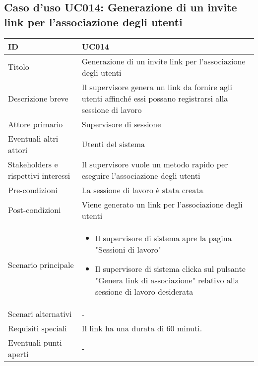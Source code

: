 \documentclass[../../main.tex]{subfiles}
\begin{document}
\subsection{Caso d’uso UC014: Generazione di un invite link per l'associazione degli utenti }
\begin{tabularx}{150mm}{|l|X|}
    \hline
    ID                                  & \textbf{UC014}\\
    \hline
    Titolo                              & Generazione di un invite link per l'associazione degli utenti \\
    \hline
    Descrizione breve                   & Il supervisore genera un link da fornire agli utenti affinché essi possano registrarsi alla sessione di lavoro   \\
    \hline
    Attore primario                     & Supervisore di sessione   \\
    \hline
    Eventuali altri attori              & Utenti del sistema   \\
    \hline
    Stakeholders e rispettivi interessi & Il supervisore vuole un metodo rapido per eseguire l'associazione degli utenti   \\
    \hline
    Pre-condizioni                      & La sessione di lavoro è stata creata   \\
    \hline
    Post-condizioni                     & Viene generato un link per l'associazione degli utenti   \\
    \hline
    Scenario principale                 & 
    \begin{itemize}
        \item Il supervisore di sistema apre la pagina "Sessioni di lavoro"
        \item Il supervisore di sistema clicka sul pulsante "Genera link di associazione" relativo alla sessione di lavoro desiderata
    \end{itemize} 
    \\
    \hline
    Scenari alternativi                 & -   \\
    \hline
    Requisiti speciali                  & Il link ha una durata di 60 minuti.  \\
    \hline
    Eventuali punti aperti              & -   \\
    \hline
\end{tabularx}
\newpage
\end{document}
